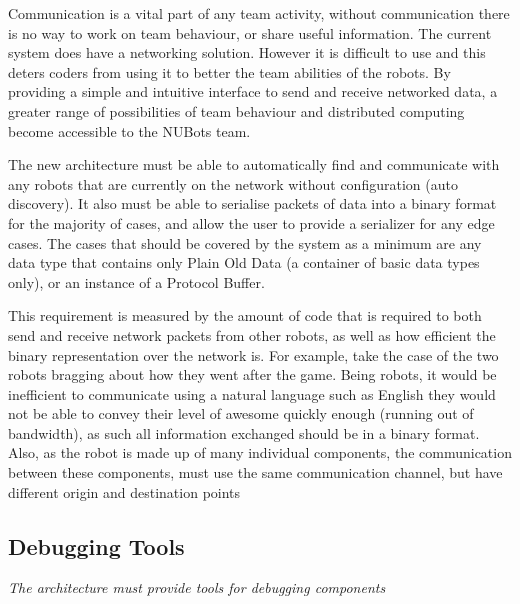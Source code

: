 \documentclass[english,12pt]{scrartcl}
\newcommand{\requirement}[1]{\textit{#1}}
\begin{document}
            Communication is a vital part of any team activity, without communication there is no
            way to work on team behaviour, or share useful information. The current system does have
            a networking solution. However it is difficult to use and this deters coders from using
            it to better the team abilities of the robots. By providing a simple and intuitive
            interface to send and receive networked data, a greater range of possibilities of team
            behaviour and distributed computing become accessible to the NUBots team.
            
            The new architecture must be able to automatically find and communicate with any robots
            that are currently on the network without configuration (auto discovery). It also must
            be able to serialise packets of data into a binary format for the majority of cases, and
            allow the user to provide a serializer for any edge cases. The cases that should be
            covered by the system as a minimum are any data type that contains only Plain Old Data
            (a container of basic data types only), or an instance of a Protocol Buffer. 
            
            
            This requirement is measured by the amount of code that is required to both send and
            receive network packets from other robots, as well as how efficient the binary
            representation over the network is. For example, take the case of the two robots
            bragging about how they went after the game. Being robots, it would be inefficient to
            communicate using a natural language such as English they would not be able to convey
            their level of awesome quickly enough (running out of bandwidth), as such all
            information exchanged should be in a binary format. Also, as the robot is made up of
            many individual components, the communication between these components, must use the
            same communication channel, but have different origin and destination points 

        \subsection{Debugging Tools}
            \requirement{The architecture must provide tools for debugging components}
            
\end{document}
